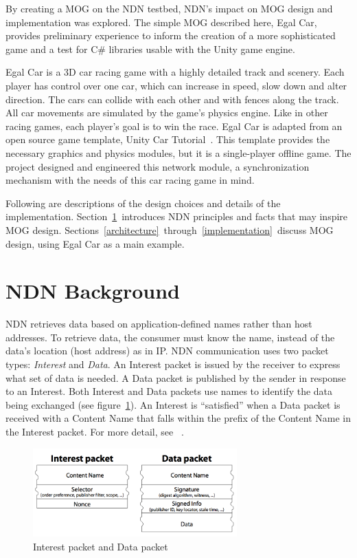 \documentclass{article}
\begin{document}
By creating a MOG on the NDN testbed, NDN's impact on MOG design and implementation was explored.  The simple MOG described here, Egal Car, provides preliminary experience to inform the creation of a more sophisticated game and a test for C\# libraries usable with the Unity game engine. 

Egal Car is a 3D car racing game with a highly detailed track and scenery. Each player has control over one car, which can increase in speed, slow down and alter direction. The cars can collide with each other and with fences along the track. All car movements are simulated by the game's physics engine. Like in other racing games, each player's goal is to win the race.  Egal Car is adapted from an open source game template, Unity  Car Tutorial~\cite{UnityCar}. This template provides the necessary graphics and physics modules, but it is a single-player offline game.  The project designed and engineered this network module, a synchronization mechanism with the needs of this car racing game in mind. 

Following are descriptions of the design choices and details of the implementation. Section~\ref{ndnbackground}~introduces NDN principles and facts that may inspire MOG design. Sections~\ref{architecture}~through~\ref{implementation}~discuss MOG design, using Egal Car as a main example.


\section{NDN Background}
\label{ndnbackground}

NDN retrieves data based on application-defined names rather than host addresses. To retrieve data, the consumer must know the name, instead of the data's location (host address) as in IP.  NDN communication uses two packet types: \emph{Interest} and \emph{Data}. An Interest packet is issued by the receiver to express what set of data is needed. A Data packet is published by the sender in response to an Interest. Both Interest and Data packets use names to identify the data being exchanged (see figure~\ref{img:packet_types}). An Interest is ``satisfied'' when a Data packet is received with a Content Name that falls within the prefix of the Content Name in the Interest packet. For more detail, see ~\cite{Jndn}. 

\begin{figure}
\begin{center}
\includegraphics[width=0.7\textwidth] {image/packet_types}
\caption{Interest packet and Data packet}
\label{img:packet_types}
\end{center}
\end{figure}
\end{document}
